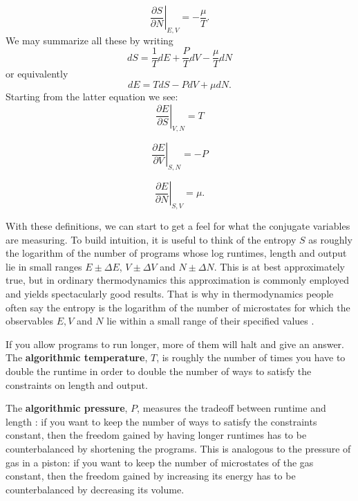 \documentclass[12pt,twoside,openright]{report}
\begin{document}
\begin{equation}
\label{derivative3}
\displaystyle{\left.\frac{\partial S}{\partial N}\right|_{E,V}}  =
-\displaystyle{\frac{\mu}{T}} .
\end{equation}
We may summarize all these by writing
\[            dS = \frac{1}{T} dE + \frac{P}{T} dV - \frac{\mu}{T} dN  \]
or equivalently
\begin{equation}
\label{differentials}
          dE = T dS - P dV + \mu dN  .
\end{equation}
Starting from the latter equation we see:
\begin{equation}
\label{derivatives1}
\displaystyle{\left.\frac{\partial E}{\partial S}\right|_{V,N}}  =
\displaystyle{T} 
\end{equation}

\begin{equation}
\label{derivatives2}
\displaystyle{\left.\frac{\partial E}{\partial V}\right|_{S,N}} =
\displaystyle{-P}
\end{equation}

\begin{equation}
\label{derivatives3}
\displaystyle{\left.\frac{\partial E}{\partial N}\right|_{S,V}}  =
\displaystyle{\mu} .
\end{equation}

With these definitions, we can start to get a feel for what the conjugate variables are measuring.  To build intuition, it is useful to think of the entropy $S$ as roughly the logarithm of the number of programs whose log runtimes, length and output lie in small ranges $E
\pm \Delta E$, $V \pm \Delta V$ and $N \pm \Delta N$. This is at best approximately true, but in ordinary thermodynamics this approximation is commonly employed and yields spectacularly good results.  That is why in thermodynamics people often say the entropy is the logarithm of the number of microstates for which the observables $E, V$ and $N$ lie within a small range of their specified values \cite{Reif}.

If you allow programs to run longer, more of them will halt and give an answer.  The \textbf{algorithmic temperature}, $T$, is roughly the number of times you have to double the runtime in order to double the number of ways to satisfy the constraints on length and output.

The \textbf{algorithmic pressure}, $P$, measures the tradeoff between runtime and length \cite{CSHalting2006}: if you want to keep the number of ways to satisfy the constraints constant, then the freedom gained by having longer runtimes has to be counterbalanced by shortening the programs. This is analogous to the pressure of gas in a piston: if you want to keep the number of microstates of the gas constant, then the freedom gained by increasing its energy has to be counterbalanced by decreasing its volume.  
\end{document}
